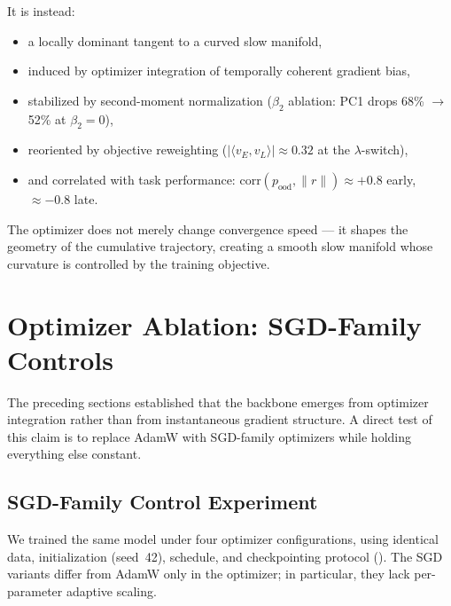 \documentclass[11pt,a4paper]{article}
\begin{document}
It is instead:
\begin{itemize}
\item a locally dominant tangent to a curved slow manifold,
\item induced by optimizer integration of temporally coherent gradient bias,
\item stabilized by second-moment normalization ($\beta_2$ ablation: PC1 drops 68\% $\to$ 52\% at $\beta_2 = 0$),
\item reoriented by objective reweighting ($|\langle v_E, v_L\rangle| \approx 0.32$ at the $\lambda$-switch),
\item and correlated with task performance: $\mathrm{corr}(p_{\mathrm{ood}}, \|r\|) \approx +0.8$ early, $\approx -0.8$ late.
\end{itemize}

The optimizer does not merely change convergence speed --- it shapes the geometry of the cumulative trajectory, creating a smooth slow manifold whose curvature is controlled by the training objective.


\section{Optimizer Ablation: SGD-Family Controls}\label{sec:sgd-control}

The preceding sections established that the backbone emerges from optimizer
integration rather than from instantaneous gradient structure.  A direct test
of this claim is to replace AdamW with SGD-family optimizers while holding
everything else constant.

\subsection{SGD-Family Control Experiment}\label{sec:sgd-variants}

We trained the same model under four optimizer configurations, using identical
data, initialization (seed~42), schedule, and checkpointing protocol
().  The SGD variants differ from AdamW only in the
optimizer; in particular, they lack per-parameter adaptive scaling.
\end{document}
